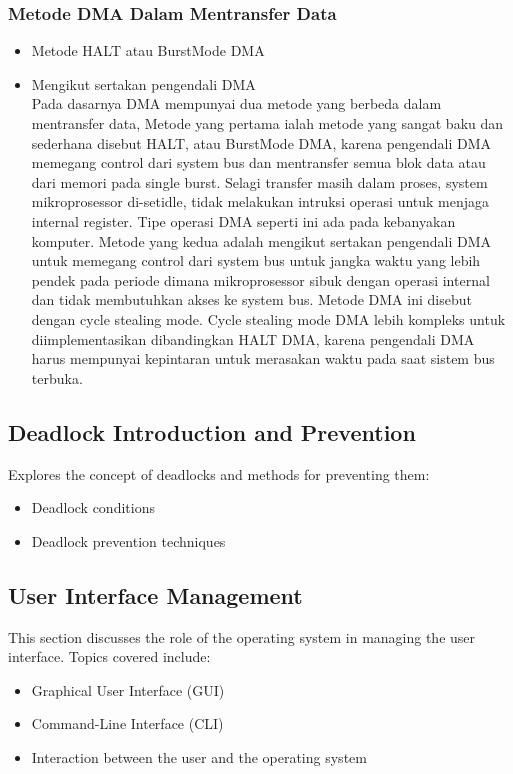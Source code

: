 \documentclass[12pt]{article}
\begin{document}
\subsubsection{Metode DMA Dalam Mentransfer Data}
\begin{itemize}
    \item Metode HALT atau BurstMode DMA
    \item Mengikut sertakan pengendali DMA \\
    Pada dasarnya DMA mempunyai dua metode yang berbeda dalam mentransfer data, Metode yang pertama ialah metode yang sangat baku dan sederhana disebut HALT, atau BurstMode DMA, karena pengendali DMA memegang control dari system bus dan mentransfer semua blok data atau dari memori pada single burst. Selagi transfer masih dalam proses, system mikroprosessor di-setidle, tidak melakukan intruksi operasi untuk menjaga internal register. Tipe operasi DMA seperti ini ada pada kebanyakan komputer. Metode yang kedua adalah mengikut sertakan pengendali DMA untuk memegang control dari system bus untuk jangka waktu yang lebih pendek pada periode dimana mikroprosessor sibuk dengan operasi internal dan tidak membutuhkan akses ke system bus. Metode DMA ini disebut dengan cycle stealing mode. Cycle stealing mode DMA lebih kompleks untuk diimplementasikan dibandingkan HALT DMA, karena pengendali DMA harus mempunyai kepintaran untuk merasakan waktu pada saat sistem bus terbuka.
\end{itemize}


\subsection{Deadlock Introduction and Prevention}
Explores the concept of deadlocks and methods for preventing them:
\begin{itemize}
    \item Deadlock conditions
    \item Deadlock prevention techniques
\end{itemize}

\subsection{User Interface Management}
This section discusses the role of the operating system in managing the user interface. Topics covered include:
\begin{itemize}
    \item Graphical User Interface (GUI)
    \item Command-Line Interface (CLI)
    \item Interaction between the user and the operating system
\end{itemize}
\end{document}
